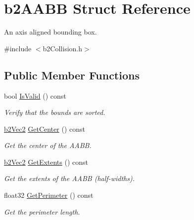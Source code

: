\hypertarget{structb2_a_a_b_b}{}\section{b2\+A\+A\+BB Struct Reference}
\label{structb2_a_a_b_b}


An axis aligned bounding box.  




{\ttfamily \#include $<$b2\+Collision.\+h$>$}

\subsection*{Public Member Functions}
\begin{DoxyCompactItemize}
\item 
\mbox{\label{structb2_a_a_b_b_a70bb45c086fcc2d7ee8694deb386070e}} 
bool \hyperlink{structb2_a_a_b_b_a70bb45c086fcc2d7ee8694deb386070e}{Is\+Valid} () const
\begin{DoxyCompactList}\small\item\em Verify that the bounds are sorted. \end{DoxyCompactList}\item 
\mbox{\label{structb2_a_a_b_b_a2c4051e79001a3166cc7f8ad811137fe}} 
\hyperlink{structb2_vec2}{b2\+Vec2} \hyperlink{structb2_a_a_b_b_a2c4051e79001a3166cc7f8ad811137fe}{Get\+Center} () const
\begin{DoxyCompactList}\small\item\em Get the center of the A\+A\+BB. \end{DoxyCompactList}\item 
\mbox{\label{structb2_a_a_b_b_a2a4f550a18d2a0895fbc5c4d3ec17d22}} 
\hyperlink{structb2_vec2}{b2\+Vec2} \hyperlink{structb2_a_a_b_b_a2a4f550a18d2a0895fbc5c4d3ec17d22}{Get\+Extents} () const
\begin{DoxyCompactList}\small\item\em Get the extents of the A\+A\+BB (half-\/widths). \end{DoxyCompactList}\item 
\mbox{\label{structb2_a_a_b_b_a25d2504d2f2fdec88f9347f62f112268}} 
float32 \hyperlink{structb2_a_a_b_b_a25d2504d2f2fdec88f9347f62f112268}{Get\+Perimeter} () const
\begin{DoxyCompactList}\small\item\em Get the perimeter length. \end{DoxyCompactList}\item 

\end{DoxyCompactItemize}
